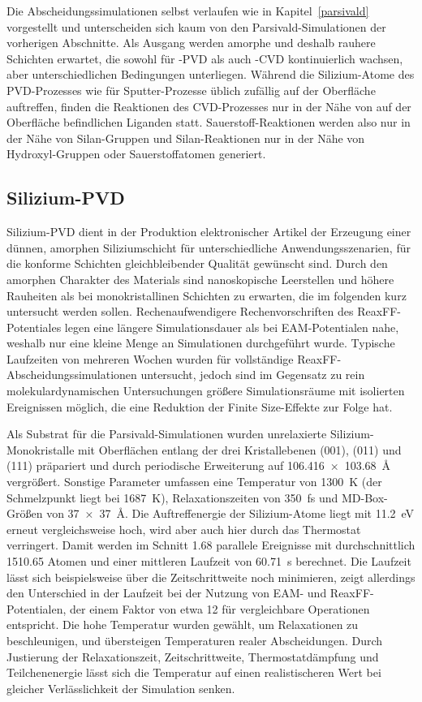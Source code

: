 Die Abscheidungssimulationen selbst verlaufen wie in Kapitel~\ref{parsivald} vorgestellt und unterscheiden sich kaum von den Parsivald-Simulationen der vorherigen Abschnitte.
Als Ausgang werden amorphe und deshalb rauhere Schichten erwartet, die sowohl für -PVD als auch -CVD kontinuierlich wachsen, aber unterschiedlichen Bedingungen unterliegen.
Während die Silizium-Atome des PVD-Prozesses wie für Sputter-Prozesse üblich zufällig auf der Oberfläche auftreffen, finden die Reaktionen des CVD-Prozesses nur in der Nähe von auf der Oberfläche befindlichen Liganden statt.
Sauerstoff-Reaktionen werden also nur in der Nähe von Silan-Gruppen und Silan-Reaktionen nur in der Nähe von Hydroxyl-Gruppen oder Sauerstoffatomen generiert.

\subsection{Silizium-PVD}

Silizium-PVD dient in der Produktion elektronischer Artikel der Erzeugung einer dünnen, amorphen Siliziumschicht für unterschiedliche Anwendungsszenarien, für die konforme Schichten gleichbleibender Qualität gewünscht sind.
Durch den amorphen Charakter des Materials sind nanoskopische Leerstellen und höhere Rauheiten als bei monokristallinen Schichten zu erwarten, die im folgenden kurz untersucht werden sollen.
Rechenaufwendigere Rechenvorschriften des ReaxFF-Potentiales legen eine längere Simulationsdauer als bei EAM-Potentialen nahe, weshalb nur eine kleine Menge an Simulationen durchgeführt wurde.
Typische Laufzeiten von mehreren Wochen wurden für vollständige ReaxFF-Abscheidungssimulationen untersucht, jedoch sind im Gegensatz zu rein molekulardynamischen Untersuchungen größere Simulationsräume mit isolierten Ereignissen möglich, die eine Reduktion der Finite Size-Effekte zur Folge hat.

Als Substrat für die Parsivald-Simulationen wurden unrelaxierte Silizium-Monokristalle mit Oberflächen entlang der drei Kristallebenen (001), (011) und (111) präpariert und durch periodische Erweiterung auf \SI{106.416x103.68}{\angstrom} vergrößert.
Sonstige Parameter umfassen eine Temperatur von \SI{1300}{\kelvin} (der Schmelzpunkt liegt bei \SI{1687}{\kelvin}), Relaxationszeiten von \SI{350}{\femto\second} und MD-Box-Größen von \SI{37x37}{\angstrom}.
Die Auftreffenergie der Silizium-Atome liegt mit \SI{11.2}{\electronvolt} erneut vergleichsweise hoch, wird aber auch hier durch das Thermostat verringert.
Damit werden im Schnitt \num{1.68} parallele Ereignisse mit durchschnittlich \num{1510.65} Atomen und einer mittleren Laufzeit von \SI{60.71}{\second} berechnet.
Die Laufzeit lässt sich beispielsweise über die Zeitschrittweite noch minimieren, zeigt allerdings den Unterschied in der Laufzeit bei der Nutzung von EAM- und ReaxFF-Potentialen, der einem Faktor von etwa \num{12} für vergleichbare Operationen entspricht.
Die hohe Temperatur wurden gewählt, um Relaxationen zu beschleunigen, und übersteigen Temperaturen realer Abscheidungen.
Durch Justierung der Relaxationszeit, Zeitschrittweite, Thermostatdämpfung und Teilchenenergie lässt sich die Temperatur auf einen realistischeren Wert bei gleicher Verlässlichkeit der Simulation senken.

